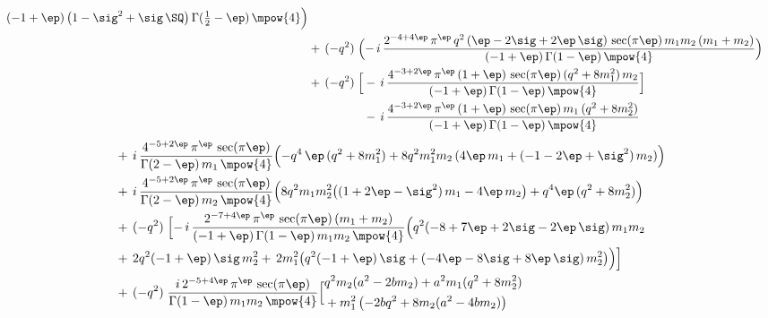 \begin{tcolorbox}[thesisresultbox, title=\textit{Full one loop amplitude in small $|q|$ expansion}, boxsep=0.5mm, left=0.5mm, right=0.5mm, top=0.5mm, bottom=0.5mm]
\begin{align*}
          {(-1+\ep)\,\bigl(1-\sig^2+\sig\,\SQ\bigr)\,\Gamma(\tfrac12-\ep)\,\mpow{4}}\Bigr)
\\
&\hspace{0cm}
 +\,(-q^2)\;
 \Bigl(-\, i\,\frac{2^{-4+4\ep}\,\pi^{\ep}\,q^{2}\,(\ep-2\sig+2\ep\,\sig)\,\sec(\pi\ep)\,m_1 m_2\,(m_1+m_2)}
             {(-1+\ep)\,\Gamma(1-\ep)\,\mpow{4}}\Bigr)
\\
&\hspace{0cm}
 +\,(-q^2)\;\Bigl[
 \begin{aligned}[t]
 &-\, i\,\frac{4^{-3+2\ep}\,\pi^{\ep}\,(1+\ep)\,\sec(\pi\ep)\,(q^2+8 m_1^{2})\,m_2}
              {(-1+\ep)\,\Gamma(1-\ep)\,\mpow{4}}
 \\
 &-\, i\,\frac{4^{-3+2\ep}\,\pi^{\ep}\,(1+\ep)\,\sec(\pi\ep)\,m_1\,(q^2+8 m_2^{2})}
              {(-1+\ep)\,\Gamma(1-\ep)\,\mpow{4}}
 \end{aligned}
 \Bigr]
\end{align*}
\label{3.54j}
\begin{align*}
&\hspace{0cm}
 +\, i\,\frac{4^{-5+2\ep}\,\pi^{\ep}\,\sec(\pi\ep)}
             {\Gamma(2-\ep)\,m_1\,\mpow{4}}
 \Bigl(
   -q^4\,\ep\,(q^2+8 m_1^{2})
   + 8 q^2 m_1^{2} m_2\,(4\ep\,m_1 + (-1-2\ep+\sig^2)\,m_2)
 \Bigr)
\\
&\hspace{0cm}
 +\, i\,\frac{4^{-5+2\ep}\,\pi^{\ep}\,\sec(\pi\ep)}
             {\Gamma(2-\ep)\,m_2\,\mpow{4}}
 \Bigl(
   8 q^2 m_1 m_2^{2}\bigl((1+2\ep-\sig^2)\,m_1 - 4\ep\,m_2\bigr)
   + q^4 \ep\,(q^2+8 m_2^{2})
 \Bigr)
\\
&\hspace{0cm}
 +\,(-q^2)\;
 \Bigl[-\, i\,\frac{2^{-7+4\ep}\,\pi^{\ep}\,\sec(\pi\ep)\,(m_1+m_2)}
             {(-1+\ep)\,\Gamma(1-\ep)\,m_1 m_2\,\mpow{4}}
   \Bigl(q^2(-8+7\ep+2\sig-2\ep\,\sig)\,m_1 m_2
\\
&\hspace{0cm}
   +\,2 q^2(-1+\ep)\,\sig\,m_2^{2}
   +\,2 m_1^{2}\bigl(q^2(-1+\ep)\,\sig + (-4\ep-8\sig+8\ep\,\sig)\,m_2^{2}\bigr)\Bigr)\Bigr]
\\
&\hspace{0cm}
 +\,(-q^2)\;
 \frac{i\,2^{-5+4\ep}\,\pi^{\ep}\,\sec(\pi\ep)}
             {\Gamma(1-\ep)\,m_1 m_2\,\mpow{4}}
\Bigl[
\begin{aligned}
& q^{2} m_2 (a^{2}-2 b m_2)
 + a^{2} m_1 (q^{2}+8 m_2^{2}) \\
& + m_1^{2}\,\bigl(-2 b q^{2} + 8 m_2(a^{2}-4 b m_2)\bigr)
\end{aligned}

\end{align*}
\end{tcolorbox}
